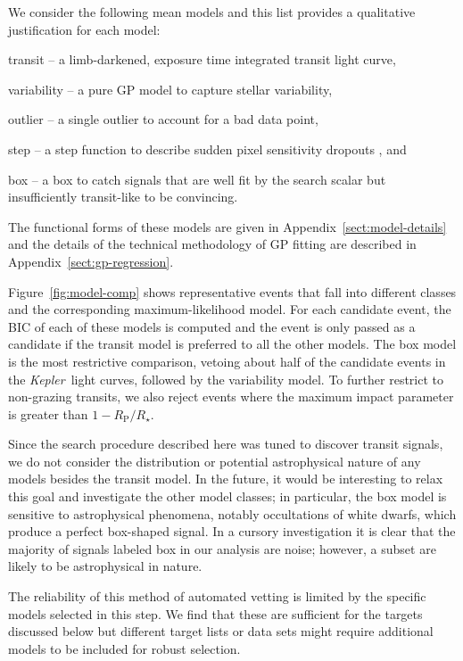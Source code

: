 \documentclass[manuscript, letterpaper]{aastex6}
\newcommand{\project}[1]{\textsl{#1}}
\newcommand{\kepler}{\project{Kepler}}
\newcommand{\dfmfigref}[1]{\ref{fig:#1}}
\newcommand{\dfmFig}[1]{Figure~\dfmfigref{#1}}
\newcommand{\dfmfig}[1]{\dfmFig{#1}}
\newcommand{\sectref}[1]{\ref{sect:#1}}
\newcommand{\App}[1]{Appendix~\sectref{#1}}
\newcommand{\app}[1]{\App{#1}}
\newcommand{\modelname}[1]{{\textsf{#1}}}
\begin{document}
We consider the following mean models and this list provides a qualitative
justification for each model:
\begin{itemize}
{\item \modelname{transit} -- a limb-darkened, exposure time integrated
transit light curve,}
{\item \modelname{variability} -- a pure GP model to capture
stellar variability,}
{\item \modelname{outlier} -- a single outlier to account for a bad data
point,}
{\item \modelname{step} -- a step function to describe sudden pixel
sensitivity dropouts \citep[SPSDs; for example][]{Christiansen:2013}, and}
{\item \modelname{box} -- a box to catch signals that are well fit by the
search scalar but insufficiently transit-like to be convincing.}
\end{itemize}
The functional forms of these models are given in \app{model-details} and the
details of the technical methodology of GP fitting are described in
\app{gp-regression}.

\dfmfig{model-comp} shows representative events that fall into different
classes and the corresponding maximum-likelihood model.
For each candidate event, the BIC of each of these models is computed and the
event is only passed as a candidate if the \modelname{transit} model is
preferred to all the other models.
The \modelname{box} model is the most restrictive comparison, vetoing about
half of the candidate events in the \kepler\ light curves, followed by the
\modelname{variability} model.
To further restrict to non-grazing transits, we also reject events where the
maximum impact parameter is greater than $1 - R_\mathrm{P} / R_\star$.

Since the search procedure described here was tuned to discover transit
signals, we do not consider the distribution or potential astrophysical nature
of any models besides the \modelname{transit} model.
In the future, it would be interesting to relax this goal and investigate the
other model classes; in particular, the \modelname{box} model is
sensitive to astrophysical phenomena, notably occultations of white dwarfs,
which produce a perfect box-shaped signal.  In a cursory investigation 
it is clear that the majority of signals labeled
\modelname{box} in our analysis are noise; however, a subset are likely to be
astrophysical in nature.

The reliability of this method of automated vetting is limited by the specific
models selected in this step.
We find that these are sufficient for the targets discussed below but
different target lists or data sets might require additional models to be
included for robust selection.
\end{document}
